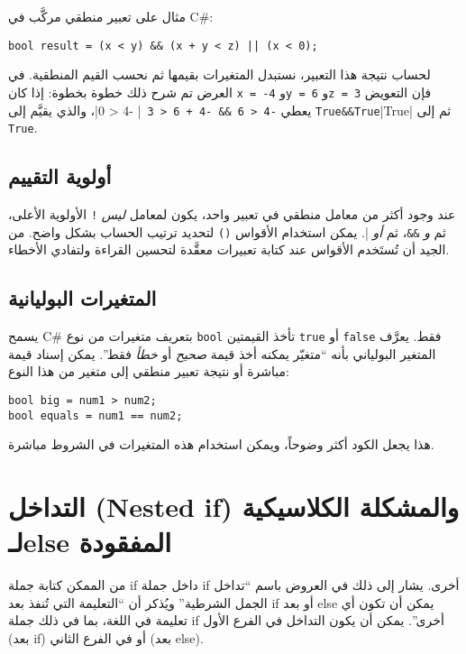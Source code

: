 \documentclass[12pt]{article}
\begin{document}
مثال على تعبير منطقي مركَّب في C\#:

\begin{english}
\begin{verbatim}
bool result = (x < y) && (x + y < z) || (x < 0);
\end{verbatim}
\end{english}

لحساب نتيجة هذا التعبير، نستبدل المتغيرات بقيمها ثم نحسب القيم المنطقية. في العرض تم شرح ذلك خطوة بخطوة: إذا كان \verb|x = -4| و\verb|y = 6| و\verb|z = 3| فإن التعويض يعطي \verb|-4 < 6 && -4 + 6 < 3 || -4 < 0|، والذي يقيَّم إلى \verb|True&&True||True| ثم إلى \verb|True|.

\subsection{أولوية التقييم}

عند وجود أكثر من معامل منطقي في تعبير واحد، يكون لمعامل \emph{ليس} \verb|!| الأولوية الأعلى، ثم \emph{و} \verb|&&|، ثم \emph{أو} \verb|||. يمكن استخدام الأقواس \verb|()| لتحديد ترتيب الحساب بشكل واضح. من الجيد أن تُستَخدم الأقواس عند كتابة تعبيرات معقَّدة لتحسين القراءة ولتفادي الأخطاء.

\subsection{المتغيرات البوليانية}

يسمح C\# بتعريف متغيرات من نوع \texttt{bool} تأخذ القيمتين \texttt{true} أو \texttt{false} فقط. يعرَّف المتغير البولياني بأنه ``متغيّر يمكنه أخذ قيمة \emph{صحيح} أو \emph{خطأ} فقط''. يمكن إسناد قيمة مباشرة أو نتيجة تعبير منطقي إلى متغير من هذا النوع:


\begin{english}
\begin{verbatim}
bool big = num1 > num2;
bool equals = num1 == num2;
\end{verbatim}
\end{english}

هذا يجعل الكود أكثر وضوحاً، ويمكن استخدام هذه المتغيرات في الشروط مباشرة.

\section{التداخل (\textenglish{Nested if}) والمشكلة الكلاسيكية لـ\textenglish{else} المفقودة}

من الممكن كتابة جملة \textenglish{if} داخل جملة \textenglish{if} أخرى. يشار إلى ذلك في العروض باسم ``تداخل الجمل الشرطية'' ويُذكر أن ``التعليمة التي تُنفذ بعد \textenglish{if} أو بعد \textenglish{else} يمكن أن تكون أي تعليمة في اللغة، بما في ذلك جملة \textenglish{if} أخرى''. يمكن أن يكون التداخل في الفرع الأول (بعد \textenglish{if}) أو في الفرع الثاني (بعد \textenglish{else}).
\end{document}
